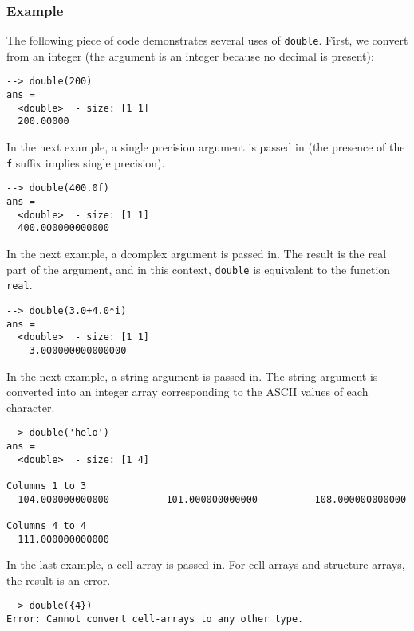 \subsubsection{Example}
The following piece of code demonstrates several uses of \verb|double|.  First, we convert from an integer (the argument is an integer because no decimal is present):
\begin{verbatim}
--> double(200)
ans =
  <double>  - size: [1 1]
  200.00000
\end{verbatim}
In the next example, a single precision argument is passed in (the presence of  the \verb|f| suffix implies single precision).
\begin{verbatim}
--> double(400.0f)
ans =
  <double>  - size: [1 1]
  400.000000000000
\end{verbatim}
In the next example, a dcomplex argument is passed in.  The result is the real part of the argument, and in this context, \verb|double| is equivalent to the function \verb|real|.
\begin{verbatim}
--> double(3.0+4.0*i)
ans =
  <double>  - size: [1 1]
    3.000000000000000
\end{verbatim}
In the next example, a string argument is passed in.  The string argument is converted into an integer array corresponding to the ASCII values of each character.
\begin{verbatim}
--> double('helo')
ans =
  <double>  - size: [1 4]
  
Columns 1 to 3
  104.000000000000          101.000000000000          108.000000000000
  
Columns 4 to 4
  111.000000000000
\end{verbatim}
In the last example, a cell-array is passed in.  For cell-arrays and structure arrays, the result is an error.
\begin{verbatim}
--> double({4})
Error: Cannot convert cell-arrays to any other type.
\end{verbatim}
